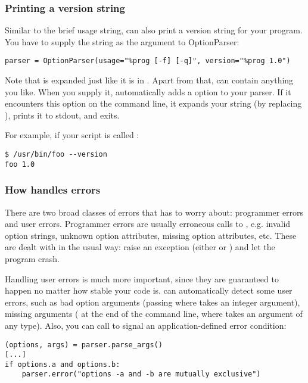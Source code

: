 \subsubsection{Printing a version string\label{optparse-printing-version-string}}

Similar to the brief usage string,  can also print a version string
for your program.  You have to supply the string as the 
argument to OptionParser:
\begin{verbatim}
parser = OptionParser(usage="%prog [-f] [-q]", version="%prog 1.0")
\end{verbatim}

Note that  is expanded just like it is in .  Apart
from that,  can contain anything you like.  When you supply
it,  automatically adds a  option to your parser.
If it encounters this option on the command line, it expands your
 string (by replacing ), prints it to stdout, and
exits.

For example, if your script is called :
\begin{verbatim}
$ /usr/bin/foo --version
foo 1.0
\end{verbatim}


\subsubsection{How  handles errors\label{optparse-how-optparse-handles-errors}}

There are two broad classes of errors that  has to worry about:
programmer errors and user errors.  Programmer errors are usually
erroneous calls to , e.g. invalid option strings,
unknown option attributes, missing option attributes, etc.  These are
dealt with in the usual way: raise an exception (either
 or ) and let the program crash.

Handling user errors is much more important, since they are guaranteed
to happen no matter how stable your code is.   can automatically
detect some user errors, such as bad option arguments (passing  where  takes an integer argument), missing arguments
( at the end of the command line, where  takes an argument
of any type).  Also, you can call  to signal an
application-defined error condition:
\begin{verbatim}
(options, args) = parser.parse_args()
[...]
if options.a and options.b:
    parser.error("options -a and -b are mutually exclusive")
\end{verbatim}

